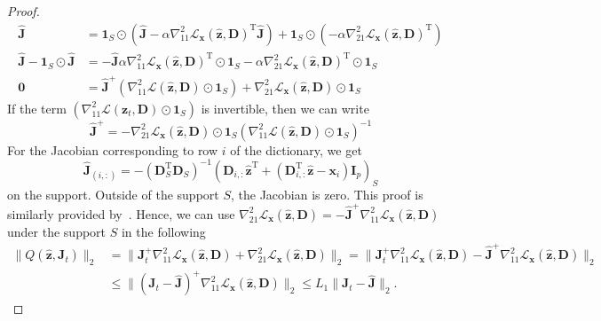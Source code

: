 \documentclass[10pt]{article} %
\newcommand{\D}{{\bm D}}
\newcommand{\eye}{{\bm I}}
\newcommand{\J}{{\bm J}}
\newcommand{\x}{{\bm x}}
\newcommand{\z}{{\bm z}}
\newcommand{\zero}{{\bm 0}}
\newcommand{\Loss}{\mathcal{L}}
\begin{document}
\begin{proof}
\begin{equation}
\begin{aligned}
\hat \J &= \mathbf{1}_{S} \odot (\hat \J - \alpha \nabla_{11}^2 \Loss_{\x}(\hat \z, \D)^{\text{T}} \hat \J) + \mathbf{1}_{S} \odot (- \alpha \nabla_{21}^2 \Loss_{\x}(\hat \z, \D)^{\text{T}})\\
%
\hat \J - \mathbf{1}_{S} \odot \hat \J &=  - \hat \J \alpha \nabla_{11}^2 \Loss_{\x}(\hat \z, \D)^{\text{T}} \odot \mathbf{1}_{S}  - \alpha \nabla_{21}^2 \Loss_{\x}(\hat \z, \D)^{\text{T}} \odot \mathbf{1}_{S}\\
%
\zero &= \hat \J^{+} (\nabla_{11}^2 \mathcal{L}(\hat \z, \D) \odot \mathbf{1}_{S}) +  \nabla_{21}^2 \Loss_{\x}(\hat \z, \D) \odot \mathbf{1}_{S}
\end{aligned}
\end{equation}
If the term $(\nabla_{11}^2 \mathcal{L}(\z_t, \D) \odot \mathbf{1}_{S})$ is invertible, then we can write
\begin{equation}
\hat \J^{+} = - \nabla_{21}^2 \Loss_{\x}(\hat \z, \D) \odot \mathbf{1}_{S} (\nabla_{11}^2 \mathcal{L}(\hat \z, \D) \odot \mathbf{1}_{S})^{-1}
\end{equation}
For the Jacobian corresponding to row $i$ of the dictionary, we get
\begin{equation}
\hat \J_{(i,:)} = - (\D_S^{\text{T}} \D_S)^{-1} (\D_{i, :} \hat \z^{\text{T}} + (\D_{i, :}^{\text{T}} \hat \z - \x_i) \eye_p)_S
\end{equation}
on the support. Outside of the support $S$, the Jacobian is zero.
%
%
This proof is similarly provided by~\citet{malezieux2022understanding}. Hence, we can use $\nabla_{21}^2\Loss_{\x}(\hat \z, \D) = - \hat \J^{+} \nabla_{11}^2\Loss_{\x}(\hat \z, \D)$ under the support $S$ in the following
\begin{equation}
\begin{aligned}
\| Q(\hat \z, \J_t) \|_2 &= \| \J_t^{+} \nabla_{11}^2\Loss_{\x}(\hat \z, \D) + \nabla_{21}^2\Loss_{\x}(\hat \z, \D) \|_2
= \| \J_t^{+} \nabla_{11}^2\Loss_{\x}(\hat \z, \D) - \hat \J^{+} \nabla_{11}^2\Loss_{\x}(\hat \z, \D) \|_2\\
&\leq \| (\J_t - \hat \J)^{+} \nabla_{11}^2\Loss_{\x}(\hat \z, \D) \|_2 \leq L_1 \| \J_t - \hat \J \|_2.
\end{aligned}
\end{equation}
\end{proof}
%
%
\end{document}
